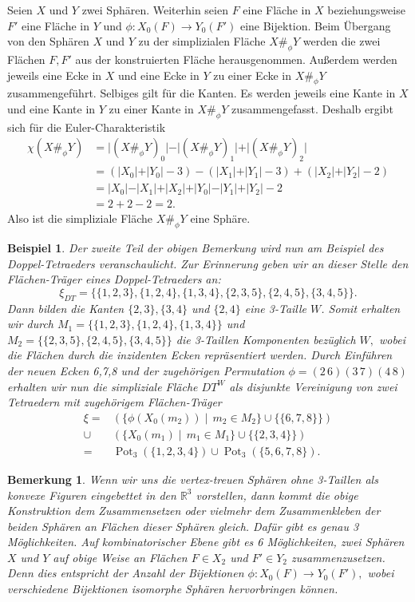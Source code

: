 \documentclass[12pt,titlepage,twoside,cleardoublepage]{article}
\theoremstyle{nummermitklammern}
\newtheorem{bsp}[temp]{Beispiel}
\newtheorem{bemerkung}[temp]{Bemerkung}
\newtheorem{bsp}[zahl]{Beispiel}
\newtheorem{bemerkung}[zahl]{Bemerkung}
\numberwithin{equation}{section}
\DeclareMathOperator{\Pot}{Pot}
\begin{document}
Seien $X$ und $Y$ zwei Sphären. Weiterhin seien  $F$ eine Fläche in $X$ beziehungsweise $F'$ eine Fläche in $Y$ und $\phi :X_0(F)\to Y_0(F')$ eine Bijektion. Beim Übergang von den Sphären $X$ und $Y$ zu der simplizialen Fläche $X\#_\phi Y$ werden die zwei Flächen $F,F'$ aus der konstruierten Fläche herausgenommen. Außerdem werden jeweils eine Ecke in $X$ und eine Ecke in $Y$ zu einer Ecke in $X\#_\phi Y$ zusammengeführt. Selbiges gilt für die Kanten. Es werden jeweils eine Kante in $X$ und eine Kante in $Y$ zu einer Kante in $X\#_\phi Y$ zusammengefasst. Deshalb ergibt sich für die Euler-Charakteristik
\begin{align*}
\chi(X\#_\phi Y)&=\vert(X\#_\phi Y)_0\vert -\vert (X\#_\phi Y)_1\vert +\vert (X\#_\phi Y)_2\vert\\
&=(\vert X_0\vert+\vert Y_0\vert-3)-(\vert X_1\vert+\vert Y_1\vert-3)+(\vert X_2\vert+\vert Y_2\vert-2)\\ 
&=\vert X_0\vert-\vert X_1\vert+\vert X_2\vert+\vert Y_0\vert-\vert Y_1\vert+\vert Y_2\vert-2\\
&=2+2-2=2.
\end{align*}
Also ist die simpliziale Fläche $X\#_\phi Y$ eine Sphäre. 
\begin{bsp}
Der zweite Teil der obigen Bemerkung wird nun am Beispiel des Doppel-Tetraeders veranschaulicht.
Zur Erinnerung geben wir an dieser Stelle den Flächen-Träger eines Doppel-Tetraeders an:
\[
\xi_{DT}=\{\{1,2,3\},\{1,2,4\},\{1,3,4\},\{2,3,5\},\{2,4,5\},\{3,4,5\}\}.
\]
Dann bilden die Kanten $\{2,3\},\{3,4\}$ und $\{2,4\}$ eine 3-Taille $W$. Somit erhalten wir durch $M_1=\{\{1,2,3\},\{1,2,4\},\{1,3,4\}\}$ und $M_2=\{\{2,3,5\},\{2,4,5\},\{3,4,5\}\}$ die 3-Taillen Komponenten bezüglich $W,$ wobei die Flächen durch die inzidenten Ecken repräsentiert werden. Durch Einführen der neuen Ecken 6,7,8 und der zugehörigen Permutation $\phi=(2\, 6)(3\, 7)(4\,8)$ erhalten wir nun die simpliziale Fläche $DT^W$ als disjunkte Vereinigung von zwei Tetraedern mit zugehörigem Flächen-Träger
\begin{align*}
\xi=&(\{\phi(X_0(m_2))\mid \, m_2\in M_2\}\cup \{\{6,7,8\}\})  \\
\cup&(\{X_0(m_1)\mid \, m_1\in M_1\}\cup \{\{2,3,4\}\})\\
=&\Pot_3(\{1,2,3,4\})\cup \Pot_3(\{5,6,7,8\}).
\end{align*}
\end{bsp}
\begin{bemerkung}
Wenn wir uns die vertex-treuen Sphären ohne 3-Taillen als konvexe Figuren eingebettet in den $\mathbb{R}^3$ vorstellen, dann kommt die obige Konstruktion dem Zusammensetzen oder vielmehr dem Zusammenkleben der beiden Sphären an Flächen dieser Sphären gleich. Dafür gibt es genau 3 Möglichkeiten. Auf kombinatorischer Ebene gibt es 6 Möglichkeiten, zwei Sphären $X$ und $Y$ auf obige Weise an 
Flächen $F\in X_2$ und $F'\in Y_2$ zusammenzusetzen. Denn dies entspricht der Anzahl der Bijektionen $\phi:X_0(F)\to Y_0(F'),$ wobei verschiedene Bijektionen isomorphe Sphären hervorbringen können.
\end{bemerkung}
\end{document}
